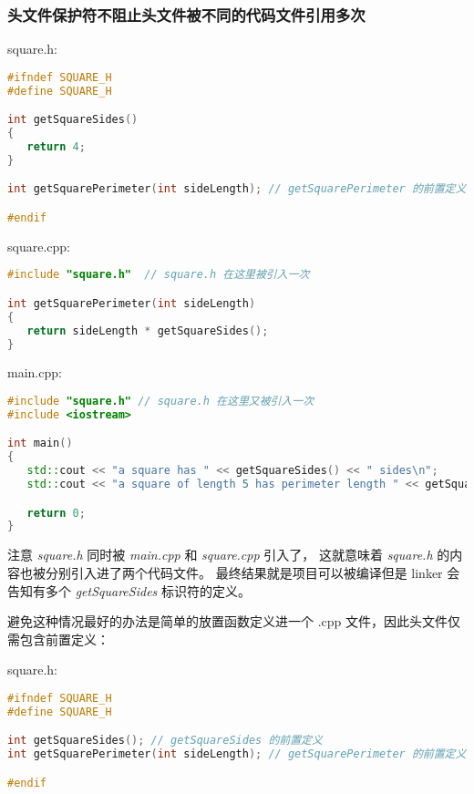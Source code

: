 \documentclass[../../LearnCpp.tex]{subfiles}
\begin{document}
\subsubsection*{头文件保护符不阻止头文件被不同的代码文件引用多次}

square.h:

\begin{lstlisting}[language=C++]
#ifndef SQUARE_H
#define SQUARE_H

int getSquareSides()
{
   return 4;
}

int getSquarePerimeter(int sideLength); // getSquarePerimeter 的前置定义

#endif
\end{lstlisting}

square.cpp:

\begin{lstlisting}[language=C++]
#include "square.h"  // square.h 在这里被引入一次

int getSquarePerimeter(int sideLength)
{
   return sideLength * getSquareSides();
}
\end{lstlisting}

main.cpp:

\begin{lstlisting}[language=C++]
#include "square.h" // square.h 在这里又被引入一次
#include <iostream>

int main()
{
   std::cout << "a square has " << getSquareSides() << " sides\n";
   std::cout << "a square of length 5 has perimeter length " << getSquarePerimeter(5) << '\n';

   return 0;
}
\end{lstlisting}

注意 \textit{square.h} 同时被 \textit{main.cpp} 和 \textit{square.cpp} 引入了，
这就意味着 \textit{square.h} 的内容也被分别引入进了两个代码文件。
最终结果就是项目可以被编译但是 linker 会告知有多个 \textit{getSquareSides} 标识符的定义。

避免这种情况最好的办法是简单的放置函数定义进一个 .cpp 文件，因此头文件仅需包含前置定义：

square.h:

\begin{lstlisting}[language=C++]
#ifndef SQUARE_H
#define SQUARE_H

int getSquareSides(); // getSquareSides 的前置定义
int getSquarePerimeter(int sideLength); // getSquarePerimeter 的前置定义

#endif
\end{lstlisting}
\end{document}
